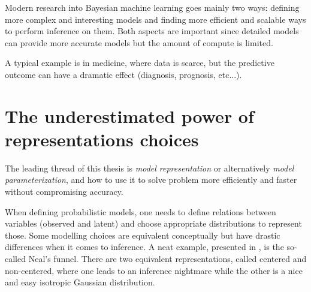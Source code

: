 Modern research into Bayesian machine learning goes mainly two ways: defining more complex and interesting models and finding more efficient and scalable ways to perform inference on them.
Both aspects are important since detailed models can provide more accurate models but the amount of compute is limited.

A typical example is in medicine, where data is scarce, but the predictive outcome can have a dramatic effect (diagnosis, prognosis, etc...).



\section{The underestimated power of representations choices}

The leading thread of this thesis is \textit{model representation} or alternatively \textit{model parameterization}, and how to use it to solve problem more efficiently and faster without compromising accuracy.

When defining probabilistic models, one needs to define relations between variables (observed and latent) and choose appropriate distributions to represent those.
Some modelling choices are equivalent conceptually but have drastic differences when it comes to inference.
A neat example, presented in \citet{gorinovaAutomaticReparameterisationProbabilistic2020}, is the so-called Neal's funnel.
There are two equivalent representations, called centered and non-centered, where one leads to an inference nightmare while the other is a nice and easy isotropic Gaussian distribution.

